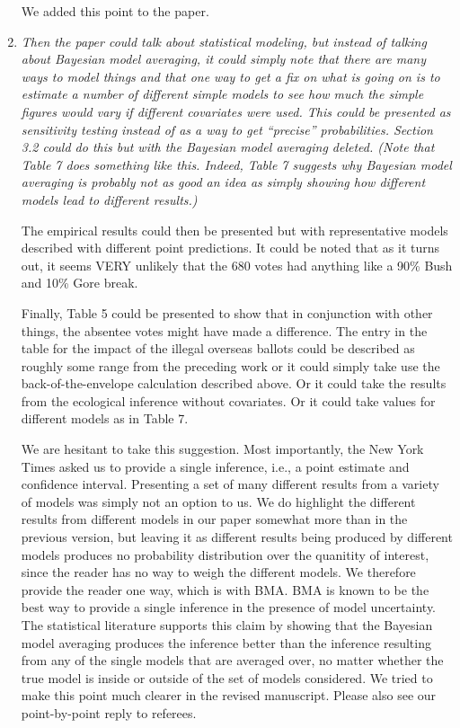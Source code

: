 \documentclass[11pt]{article}
\begin{document}
\begin{enumerate}
  We added this point to the paper.
  
\item {\it Then the paper could talk about statistical modeling, but
    instead of talking about Bayesian model averaging, it could simply
    note that there are many ways to model things and that one way to
    get a fix on what is going on is to estimate a number of different
    simple models to see how much the simple figures would vary if
    different covariates were used.  This could be presented as
    sensitivity testing instead of as a way to get ``precise''
    probabilities.  Section 3.2 could do this but with the Bayesian
    model averaging deleted.  (Note that Table 7 does something like
    this.  Indeed, Table 7 suggests why Bayesian model averaging is
    probably not as good an idea as simply showing how different
    models lead to different results.) 
    
    The empirical results could then be presented but with
    representative models described with different point predictions.
    It could be noted that as it turns out, it seems VERY unlikely
    that the 680 votes had anything like a 90\% Bush and 10\% Gore
    break.
  
    Finally, Table 5 could be presented to show that in conjunction
    with other things, the absentee votes might have made a
    difference.  The entry in the table for the impact of the illegal
    overseas ballots could be described as roughly some range from the
    preceding work or it could simply take use the
    back-of-the-envelope calculation described above.  Or it could
    take the results from the ecological inference without covariates.
    Or it could take values for different models as in Table 7.}
  
  We are hesitant to take this suggestion.  Most importantly, the New
  York Times asked us to provide a single inference, i.e., a point
  estimate and confidence interval. Presenting a set of many different
  results from a variety of models was simply not an option to us.  We
  do highlight the different results from different models in our
  paper somewhat more than in the previous version, but leaving it as
  different results being produced by different models produces no
  probability distribution over the quanitity of interest, since the
  reader has no way to weigh the different models.  We therefore
  provide the reader one way, which is with BMA.  BMA is known to be
  the best way to provide a single inference in the presence of model
  uncertainty.  The statistical literature supports this claim by
  showing that the Bayesian model averaging produces the inference
  better than the inference resulting from any of the single models
  that are averaged over, no matter whether the true model is inside
  or outside of the set of models considered.  We tried to make this
  point much clearer in the revised manuscript.  Please also see our
  point-by-point reply to referees.

\end{enumerate}
\end{document}
